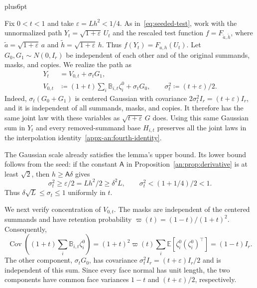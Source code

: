 \documentclass[11pt,letterpaper,twoside,leqno]{article}
\makeatletter
\theoremstyle{bookplain}
\theoremstyle{bookremark}
\renewenvironment{proof}[1][\proofname]{\par
  \pushQED{\qed}\normalfont\topsep6pt plus6pt\relax
  \trivlist\item[\hskip\labelsep\bfseries #1\@addpunct{.}]\ignorespaces
}{\popQED\endtrivlist\@endpefalse}
\newcommand{\E}{\mathbb E}
\newcommand{\Cov}{\operatorname{Cov}}
\makeatother
\begin{document}
\begin{proof}[Proof of the seeded estimates~\eqref{eq:seeded-derivatives}]
Fix $0<t<1$ and take $\varepsilon=Lh^2<1/4$. As
in~\eqref{eq:seeded-test}, work with the unnormalized path
$Y_t=\sqrt{1+\varepsilon}\,U_t$ and the rescaled test function
$f=F_{\widetilde a,\widetilde h}$, where
$\widetilde a=\sqrt{1+\varepsilon}\,a$ and
$\widetilde h=\sqrt{1+\varepsilon}\,h$. Thus
$f(Y_t)=F_{a,h}(U_t)$.
Let $G_0,G_1\sim N(0,I_r)$ be independent of each other and of
the original summands, masks, and copies. We realize the path as
\begin{equation}
 \begin{aligned}
 Y_t&=V_{0,t}+\sigma_tG_1,\\
 V_{0,t}&\coloneqq(1+t)\sum_i\mathbb B_{i,t}\zeta_i^0
                      +\sigma_tG_0,\qquad
 \sigma_t^2\coloneqq(t+\varepsilon)/2.
 \end{aligned}
 \label{eq:seeded-gaussian-split}
\end{equation}
Indeed, $\sigma_t(G_0+G_1)$ is centered Gaussian with covariance
$2\sigma_t^2I_r=(t+\varepsilon)I_r$, and it is independent of
all summands, masks, and copies. It therefore has the same joint
law with these variables as $\sqrt{t+\varepsilon}\,G$ does.
Using this same Gaussian sum in $Y_t$ and every removed-summand
base $H_{i,t}$ preserves all the joint laws in the interpolation
identity~\eqref{appx-an:fourth-identity}.

The Gaussian scale already satisfies the lemma's upper bound.
Its lower bound follows from the seed: if the constant
$\mathsf A$ in Proposition~\ref{an:prop:derivative} is at least
$\sqrt2$, then $h\ge\mathsf A\delta$ gives
\[
 \sigma_t^2\ge\varepsilon/2=Lh^2/2\ge\delta^2L,
 \qquad
 \sigma_t^2<(1+1/4)/2<1.
\]
Thus $\delta\sqrt L\le\sigma_t\le1$ uniformly in $t$.

We next verify concentration of $V_{0,t}$. The masks are
independent of the centered summands and have retention
probability $\varpi(t)=(1-t)/(1+t)^2$. Consequently,
\[
 \Cov\left((1+t)\sum_i\mathbb B_{i,t}\zeta_i^0\right)
 =(1+t)^2\varpi(t)\sum_i\E[\zeta_i^0(\zeta_i^0)^\top]
 =(1-t)I_r.
\]
The other component, $\sigma_tG_0$, has covariance
$\sigma_t^2I_r=(t+\varepsilon)I_r/2$ and is independent of this
sum. Since every face normal has unit length, the two components
have common face variances $1-t$ and $(t+\varepsilon)/2$,
respectively.


\end{proof}
\end{document}
